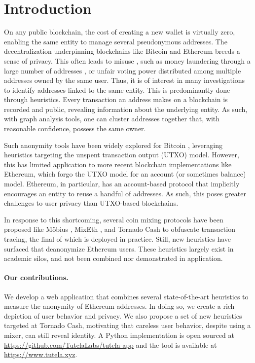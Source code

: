 \section{Introduction} \label{sec:introduction}

On any public blockchain, the cost of creating a new wallet is virtually zero, enabling the same entity to manage several pseudonymous addresses. The decentralization underpinning blockchains like Bitcoin \citep{nakamoto2008bitcoin} and Ethereum \citep{buterin2013ethereum} breeds a sense of privacy. This often leads to misuse \citep{christin2013traveling}, such as money laundering through a large number of addresses \citep{moser2013inquiry}, or unfair voting power distributed among multiple addresses owned by the same user. Thus, it is of interest in many investigations to identify addresses linked to the same entity. This is predominantly done through heuristics. Every transaction an address makes on a blockchain is recorded and public, revealing information about the underlying entity. As such, with graph analysis tools, one can cluster addresses together that, with reasonable confidence, possess the same owner.

Such anonymity tools have been widely explored for Bitcoin \cite{haslhofer2016bitcoin}, leveraging heuristics targeting the unspent transaction output (UTXO) model. However, this has limited application to more recent blockchain implementations like Ethereum, which forgo the UTXO model for an account (or sometimes balance) model.
Ethereum, in particular, has an account-based protocol that implicitly encourages an entity to reuse a handful of addresses.
As such, this poses greater challenges to user privacy than UTXO-based blockchains.

In response to this shortcoming, several coin mixing protocols have been proposed like M\"{o}bius \citep{meiklejohn2018mobius}, MixEth \citep{seres2019mixeth}, and Tornado Cash \citep{pertsev2019tornado} to obfuscate transaction tracing, the final of which is deployed in practice.
Still, new heuristics have surfaced \citep{victor2020address,beres2021blockchain} that deanonymize Ethereum users. These heuristics largely exist in academic silos, and not been combined nor demonstrated in application.

\paragraph{Our contributions.} We develop a web application that combines several state-of-the-art heuristics to measure the anonymity of Ethereum addresses. In doing so, we create a rich depiction of user behavior and privacy.
We also propose a set of new heuristics targeted at Tornado Cash, motivating that careless user behavior, despite using a mixer, can still reveal identity. A Python implementation is open sourced at \url{https://github.com/TutelaLabs/tutela-app} and the tool is available at \url{https://www.tutela.xyz}.

